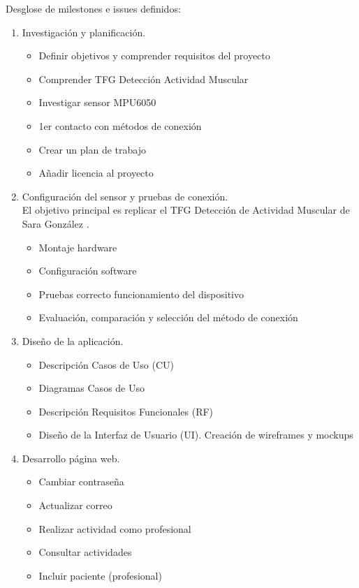 Desglose de milestones e issues definidos:
\begin{enumerate}
    \item Investigación y planificación.
    \begin{itemize}
        \item Definir objetivos y comprender requisitos del proyecto
        \item Comprender TFG Detección Actividad Muscular
        \item Investigar sensor MPU6050
        \item 1er contacto con métodos de conexión
        \item Crear un plan de trabajo
        \item Añadir licencia al proyecto
    \end{itemize}
    \item Configuración del sensor y pruebas de conexión.\\
    El objetivo principal es replicar el TFG Detección de Actividad Muscular de Sara González \cite{saragonz91:online}. 
    \begin{itemize}
        \item Montaje hardware
        \item Configuración software
        \item Pruebas correcto funcionamiento del dispositivo
        \item Evaluación, comparación y selección del método de conexión
    \end{itemize}
    \item Diseño de la aplicación.
    \begin{itemize}
        \item Descripción Casos de Uso (CU)
        \item Diagramas Casos de Uso
        \item Descripción Requisitos Funcionales (RF)
        \item Diseño de la Interfaz de Usuario (UI). Creación de wireframes y mockups
    \end{itemize}
    \item Desarrollo página web.
    \begin{itemize}
        \item Cambiar contraseña
        \item Actualizar correo
        \item Realizar actividad como profesional
        \item Consultar actividades
        \item Incluir paciente (profesional)

\end{itemize}
\end{enumerate}
